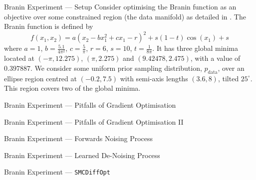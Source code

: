 \documentclass{beamer}
\begin{document}
    \begin{frame}{Branin Experiment --- Setup}
        Consider optimising the Branin function as an objective over
        some constrained region (the data manifold) as detailed in
        \textcite{kongDiffusionModelsConstrained2024}. The Branin function is defined by
        \begin{equation*}
            f(x_1, x_2) = a(x_2 - bx_1^2 + cx_1 - r)^2 + s(1-t)\cos(x_1) + s
        \end{equation*}
        where $a=1$, $b = \frac{5.1}{4\pi^2}$, $c=\frac{5}{\pi}$, $r=6$, $s=10$, $t=\frac{1}{8\pi}$.
        It has three global minima located at $(-\pi, 12.275)$, $(\pi, 2.275)$ and $(9.42478, 2.475)$,
        with a value of $0.397887$. We consider some uniform prior sampling distribution, $p_{\text{data}}$,
        over an ellipse region centred at $(-0.2, 7.5)$ with semi-axis lengths $(3.6, 8)$, tilted
        $25^\circ$. This region covers two of the global minima.
    \end{frame}

    \begin{frame}{Branin Experiment --- Pitfalls of Gradient Optimisation}
        \centering
    \end{frame}

    \begin{frame}{Branin Experiment --- Pitfalls of Gradient Optimisation II}
        \centering
    \end{frame}

    \begin{frame}{Branin Experiment --- Forwards Noising Process}
        \centering
    \end{frame}

    \begin{frame}{Branin Experiment --- Learned De-Noising Process}
        \centering
    \end{frame}

    \begin{frame}{Branin Experiment --- \texttt{SMCDiffOpt}}
        \centering
    \end{frame}
\end{document}
